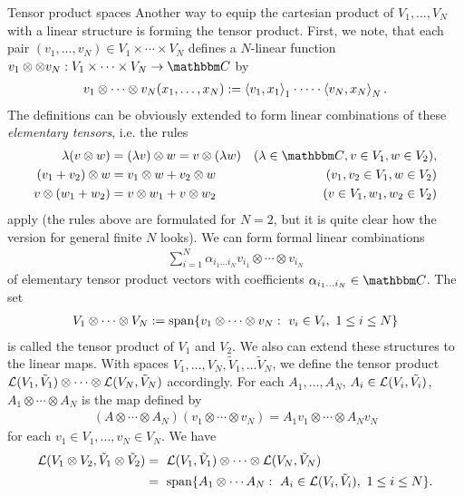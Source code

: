  \begin{subsection}{Tensor product spaces}
  Another way to equip the cartesian product of $V_1, \dots, V_N$ with a linear structure is forming the tensor product. First, we note, that each 
  pair $(v_1,\dots, v_N) \in V_1 \times \cdots \times V_N$ defines a $N$-linear function $v_1 \otimes  \otimes v_N: V_1 \times \dots \times V_N \rightarrow \bbmC$ by
  \begin{align*}
   v_1 \otimes \dots \otimes v_N (x_1,\dots, x_N) := \braket{v_1, x_1}_1\cdot \dots \cdot \braket{v_N,x_N}_N. 
  \end{align*}
  The definitions can be obviously extended to form linear combinations of these \emph{elementary tensors}, i.e. the rules
  \begin{align*}
    \lambda (v \otimes w) 
    &= (\lambda v) \otimes w = v \otimes (\lambda w)  &(\lambda \in \bbmC, v \in V_1, w \in V_2) , \\
    (v_1 + v_2) \otimes w 
    &= v_1 \otimes w + v_2 \otimes w &(v_1,v_2 \in V_1, w \in V_2) \\
    v \otimes (w_1 + w_2)
    &= v \otimes w_1 + v \otimes w_2 &(v \in V_1, w_1, w_2 \in V_2) 
  \end{align*}
  apply (the rules above are formulated for $N=2$, but it is quite clear how the version for general finite $N$ looks). We can form formal linear combinations 
  \begin{align*}
   \sum_{i=1}^N \alpha_{i_1\dots i_N} v_{i_1} \otimes \cdots \otimes v_{i_N}
  \end{align*}
  of elementary tensor product vectors with coefficients $\alpha_{i_1\dots i_N} \in \bbmC$. The set 
  \begin{align*}
   V_1 \otimes \cdots \otimes V_N := \mathrm{span} \{v_1 \otimes \cdots \otimes v_N: \  v_i \in V_i, \ 1 \leq i \leq N\}
  \end{align*}
  is called the tensor product of $V_1$ and $V_2$. We also can extend these structures to the linear maps. With spaces $V_1, \dots, V_N, \tilde{V}_1, \dots  
  \tilde{V}_N$, we define the tensor product ${\mathcal L}(V_1,\tilde{V}_1) \otimes \dots \otimes {\mathcal L}(V_N, \tilde{V}_N)$ accordingly. For each $A_1,\dots,A_N$, $A_i \in {\mathcal L}(V_i,\tilde{V_i})$, $A_1 \otimes \cdots \otimes A_N$ is the map defined by 
  \begin{align*}
   (A \otimes \cdots \otimes A_N)(v_1 \otimes \cdots \otimes v_N) 
   = A_1v_1 \otimes \cdots \otimes A_N v_N
  \end{align*}
  for each $v_1 \in V_1, \dots, v_N \in V_N$. We have
  \begin{align*}
     {\mathcal L}(V_1 \otimes V_2, \tilde{V}_1 \otimes \tilde{V}_2) 
   &= \ {\mathcal L}(V_1, \tilde{V}_1) \otimes \cdots \otimes {\mathcal L}(V_N, \tilde{V}_N)  \\
   &= \ \mathrm{span} \{A_1 \otimes \cdots A_N: \ A_i \in {\mathcal L}(V_i, \tilde{V}_i), \ 1 \leq i \leq N\}.
  \end{align*}
  
 \end{subsection}
